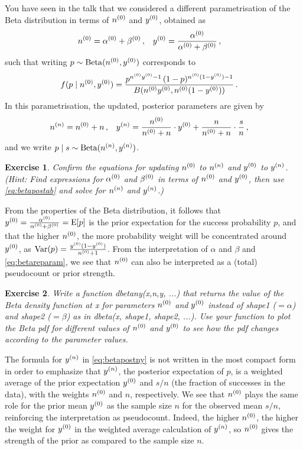 \documentclass[12pt,a4paper	,twoside]{article}
\newcommand{\E}{\operatorname{E}}
\newcommand{\V}{\operatorname{Var}}
\newcommand{\be}{\operatorname{Beta}}
\newcommand{\code}[1]{\emph{\ttfamily #1}}
\newtheorem{myex}{Exercise}
\begin{document}
You have seen in the talk that we considered a different parametrisation of the Beta distribution
in terms of $n^{(0)}$ and $y^{(0)}$, obtained as
\begin{align}
n^{(0)} &= \alpha^{(0)} + \beta^{(0)}\,, & y^{(0)} &= \frac{\alpha^{(0)}}{\alpha^{(0)}+\beta^{(0)}}\,,
\label{eq:betareparam}
\end{align}
such that writing $p \sim \be(\nz,\yz)$ corresponds to
\begin{align}
f(p\mid n^{(0)},y^{(0)}) &= \frac{p^{n^{(0)}y^{(0)}-1}\, (1-p)^{n^{(0)}(1-y^{(0)})-1}}{B(n^{(0)}y^{(0)},n^{(0)}(1-y^{(0)}))}\,.
\label{eq:betadensny}
\end{align}
In this parametrisation, the updated, posterior parameters are given by
\begin{align}
n^{(n)} &= n^{(0)} + n\,, &
y^{(n)} &= \frac{n^{(0)}}{n^{(0)} + n} \cdot y^{(0)} + \frac{n}{n^{(0)} + n} \cdot \frac{s}{n}\,,
\label{eq:betapostny}
\end{align}
and we write $p\mid s \sim \be(\nn,\yn)$.

\begin{myex}
Confirm the equations for updating $n^{(0)}$ to $n^{(n)}$ and $y^{(0)}$ to $y^{(n)}$.
(Hint: Find expressions for $\alpha^{(0)}$ and $\beta^{(0)}$ in terms of $n^{(0)}$ and $y^{(0)}$,
then use \eqref{eq:betapostab} and solve for $n^{(n)}$ and $y^{(n)}$.)
\end{myex}

From the properties of the Beta distribution,
it follows that $\yz = \frac{\az}{\az+\bz} = \E[p]$
is the prior expectation for the success probability $p$,
and that the higher $n^{(0)}$, the more probability weight will be concentrated around $y^{(0)}$,
as $\V(p) = \frac{\yz (1-\yz)}{\nz + 1}$.
From the interpretation of $\alpha$ and $\beta$ and \eqref{eq:betareparam},
we see that $n^{(0)}$ can also be interpreted as a (total) pseudocount or prior strength.

\begin{myex}\label{ex:dbetany}
Write a function \code{dbetany(x,n,y, ...)}
that returns the value of the Beta density function at \code{x}
for parameters $n^{(0)}$ and $y^{(0)}$ instead of \code{shape1} ($=\alpha$) and \code{shape2} ($=\beta$)
as in \code{dbeta(x, shape1, shape2, ...)}.
Use your function to plot the Beta pdf for different values of $n^{(0)}$ and $y^{(0)}$
to see how the pdf changes according to the parameter values.
\end{myex}

The formula for $y^{(n)}$ in \eqref{eq:betapostny} is not written in the most compact form
in order to emphasize that $y^{(n)}$, the posterior expectation of $p$,
is a weighted average of the prior expectation $y^{(0)}$ and $s/n$ (the fraction of successes in the data),
with the weights $n^{(0)}$ and $n$, respectively.
We see that $n^{(0)}$ plays the same role for the prior mean $y^{(0)}$
as the sample size $n$ for the observed mean $s/n$,
reinforcing the interpretation as pseudocount.
Indeed, the higher $n^{(0)}$, the higher the weight for $y^{(0)}$
in the weighted average calculation of $y^{(n)}$,
so $n^{(0)}$ gives the strength of the prior as compared to the sample size $n$.
\end{document}
